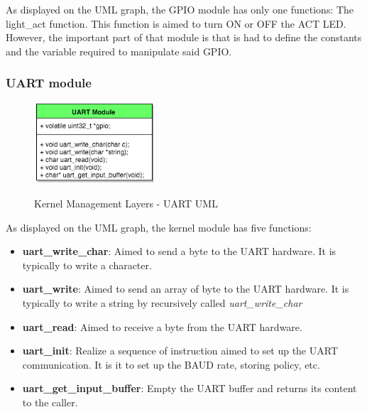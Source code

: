 As displayed on the UML graph, the GPIO module has only one functions: The light\_act function. This function is aimed to turn ON or OFF the ACT LED.
However, the important part of that module is that is had to define the constants and the variable required to manipulate said GPIO.




\subsubsection{UART module}

\begin{figure}[H]
\begin{center}
\includegraphics[width=0.4\textwidth]{includes/figures/chapter5_kernel_management_layer_UART_UML.png}  \\
\caption{Kernel Management Layers - UART UML}
\end{center}
\label{fig:chapter5_kernel_management_layer_UART_UML}
\end{figure}


As displayed on the UML graph, the kernel module has five functions:
\begin{itemize}
	\item \textbf{uart\_write\_char}: Aimed to send a byte to the UART hardware. It is typically to write a character.
	\item \textbf{uart\_write}: Aimed to send an array of byte to the UART hardware. It is typically to write a string by recursively called \textit{uart\_write\_char}
	\item \textbf{uart\_read}: Aimed to receive a byte from the UART hardware.
	\item \textbf{uart\_init}: Realize a sequence of instruction aimed to set up the UART communication. It is it to set up the BAUD rate, storing policy, etc.
	\item \textbf{uart\_get\_input\_buffer}: Empty the UART buffer and returns its content to the caller.
\end{itemize}





